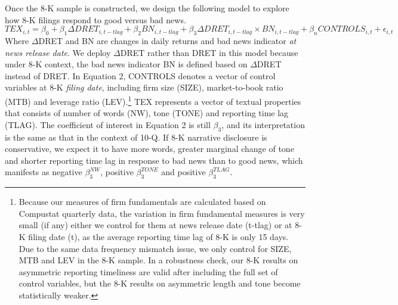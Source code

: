 \documentclass[letterpaper,11pt]{article}
\begin{document}
\begin{spacing}{1.5}
Once the 8-K sample is constructed, we design the following model to explore how 8-K filings respond to good versus bad news.
\begin{equation} \label{eq2}
TEX_{i,t}=\beta_0+\beta_1\Delta DRET_{i,t-tlag}+\beta_2BN_{i,t-tlag}+\beta_3\Delta DRET_{i,t-tlag}\times BN_{i,t-tlag}+\beta_nCONTROLS_{i,t}+\epsilon_{i,t}
\end{equation}
Where $\Delta$DRET and BN are changes in daily returns and bad news indicator \textit{at news release date}. We deploy $\Delta$DRET rather than DRET in this model because under 8-K context, the bad news indicator BN is defined based on $\Delta$DRET instead of DRET. In Equation 2, CONTROLS denotes a vector of control variables at 8-K \textit{filing date}, including firm size (SIZE), market-to-book ratio (MTB) and leverage ratio (LEV).\footnote{Because our measures of firm fundamentals are calculated based on Compustat quarterly data, the variation in firm fundamental measures is very small (if any) either we control for them at news release date (t-tlag) or at 8-K filing date (t), as the average reporting time lag of 8-K is only 15 days. Due to the same data frequency mismatch issue, we only control for SIZE, MTB and LEV in the 8-K sample. In a robustness check, our 8-K results on asymmetric reporting timeliness are valid after including the full set of control variables, but the 8-K results on asymmetric length and tone become statistically weaker.} TEX represents a vector of textual properties that consists of number of words (NW), tone (TONE) and reporting time lag (TLAG). The coefficient of interest in Equation 2 is still $\beta_3$, and its interpretation is the same as that in the context of 10-Q. If 8-K narrative disclosure is conservative, we expect it to have more words, greater marginal change of tone and shorter reporting time lag in response to bad news than to good news, which manifests as negative $\beta_3^{NW}$, positive  $\beta_3^{TONE}$ and positive $\beta_3^{TLAG}$.


\end{spacing}
\end{document}
